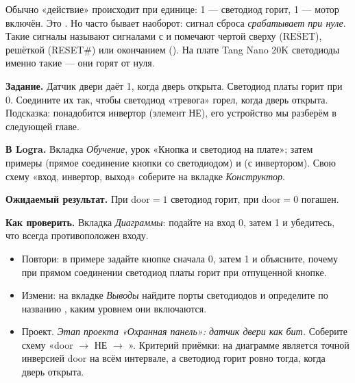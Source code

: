 \begin{infobox}
Обычно «действие» происходит при единице: 1 --- светодиод горит, 1 --- мотор
включён. Это . Но часто бывает наоборот: сигнал
сброса \emph{срабатывает при нуле}. Такие сигналы называют сигналами с
 и помечают чертой сверху ($\overline{\text{RESET}}$),
решёткой (RESET\#) или окончанием  (). На плате Tang
Nano 20K светодиоды именно такие --- они горят от нуля.
\end{infobox}

\begin{diybox}
\textbf{Задание.} Датчик двери даёт 1, когда дверь открыта. Светодиод платы
горит при 0. Соедините их так, чтобы светодиод «тревога» горел, когда дверь
открыта. Подсказка: понадобится инвертор (элемент НЕ), его устройство мы
разберём в следующей главе.\par
\textbf{В Logra.} Вкладка \emph{Обучение}, урок «Кнопка и светодиод на
плате»; затем примеры  (прямое соединение кнопки со
светодиодом) и  (с инвертором). Свою схему «вход, инвертор,
выход» соберите на вкладке \emph{Конструктор}.\par
\textbf{Ожидаемый результат.} При door${}=1$ светодиод горит, при
door${}=0$ погашен.\par
\textbf{Как проверить.} Вкладка \emph{Диаграммы}: подайте на вход 0, затем
1 и убедитесь, что  всегда противоположен входу.
\begin{itemize}[leftmargin=3.4em,labelwidth=3em,labelsep=0.4em,align=left]
  \item[\stars{1}] Повтори: в примере  задайте кнопке сначала 0,
    затем 1 и объясните, почему при прямом соединении светодиод платы
    горит при отпущенной кнопке.
  \item[\stars{2}] Измени: на вкладке \emph{Выводы} найдите порты светодиодов и
    определите по названию , каким уровнем они включаются.
  \item[\stars{3}] Проект. \emph{Этап проекта «Охранная панель»: датчик двери
    как бит.} Соберите схему «door $\to$ НЕ $\to$ ».
    Критерий приёмки: на диаграмме  является точной
    инверсией door на всём интервале, а светодиод горит ровно тогда, когда
    дверь открыта.
\end{itemize}
\end{diybox}

